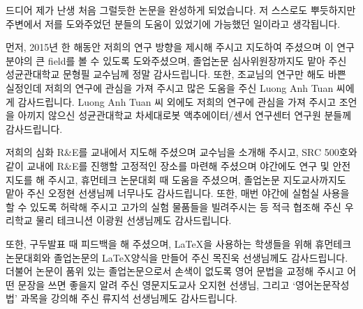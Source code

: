 \clearpage




\begin{acknowledgements}
드디어 제가 난생 처음 그럴듯한 논문을 완성하게 되었습니다. 저 스스로도 뿌듯하지만 주변에서 저를 도와주었던 분들의 도움이 있었기에 가능했던 일이라고 생각됩니다.

먼저, 2015년 한 해동안 저희의 연구 방향을 제시해 주시고 지도하여 주셨으며 이 연구 분야의 큰 field를 볼 수 있도록 도와주셨으며, 졸업논문 심사위원장까지도 맡아 주신 성균관대학교 문형필 교수님께 정말 감사드립니다. 또한, 조교님의 연구만 해도 바쁜 실정인데 저희의 연구에 관심을 가져 주시고 많은 도움을 주신 Luong Anh Tuan 씨에게 감사드립니다. Luong Anh Tuan 씨 외에도 저희의 연구에 관심을 가져 주시고 조언을 아끼지 않으신 성균관대학교 차세대로봇 액추에이터/센서 연구센터 연구원 분들께 감사드립니다.

저희의 심화 R\&E를 교내에서 지도해 주셨으며 교수님을 소개해 주시고, SRC 500호와 같이 교내에 R\&E를 진행할 고정적인 장소를 마련해 주셨으며 야간에도 연구 및 안전 지도를 해 주시고, 휴먼테크 논문대회 때 도움을 주셨으며, 졸업논문 지도교사까지도 맡아 주신 오정현 선생님께 너무나도 감사드립니다. 또한, 매번 야간에 실험실 사용을 할 수 있도록 허락해 주시고 고가의 실험 물품들을 빌려주시는 등 적극 협조해 주신 우리학교 물리 테크니션 이광원 선생님께도 감사드립니다.

또한, 구두발표 때 피드백을 해 주셨으며, \LaTeX 을 사용하는 학생들을 위해 휴먼테크논문대회와 졸업논문의 \LaTeX 양식을 만들어 주신 목진욱 선생님께도 감사드립니다. %
더불어 논문이 품위 있는 졸업논문으로서 손색이 없도록 영어 문법을 교정해 주시고 어떤 문장을 쓰면 좋을지 알려 주신 영문지도교사 오지현 선생님, 그리고 `영어논문작성법' 과목을 강의해 주신 류지석 선생님께도 감사드립니다.


\end{acknowledgements}

